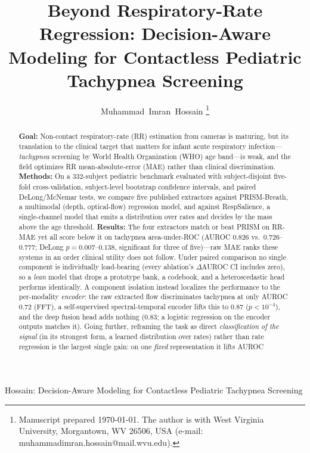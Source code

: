 \documentclass[journal]{IEEEtran}
\begin{document}
\title{Beyond Respiratory-Rate Regression: Decision-Aware Modeling for Contactless Pediatric Tachypnea
Screening}

\author{Muhammad~Imran~Hossain%
\thanks{Manuscript prepared \today. The author is with West Virginia University, Morgantown, WV 26506,
USA (e-mail: muhammadimran.hossain@mail.wvu.edu).}}

%
{Hossain: Decision-Aware Modeling for Contactless Pediatric Tachypnea Screening}

\maketitle

\begin{abstract}
\textbf{Goal:} Non-contact respiratory-rate (RR) estimation from cameras is maturing, but its
translation to the clinical target that matters for infant acute respiratory infection---\emph{tachypnea}
screening by World Health Organization (WHO) age band---is weak, and the field optimizes RR
mean-absolute-error (MAE) rather than clinical discrimination. \textbf{Methods:} On a 332-subject
pediatric benchmark evaluated with subject-disjoint five-fold cross-validation, subject-level bootstrap
confidence intervals, and paired DeLong/McNemar tests, we compare five published extractors against
PRISM-Breath, a multimodal (depth, optical-flow) regression model, and against RespSalience, a
single-channel model that emits a distribution over rates and decides by the mass above the age
threshold. \textbf{Results:} The four extractors match or beat PRISM on RR-MAE yet all score below it on
tachypnea area-under-ROC
(AUROC $0.826$ vs.\ $0.726$--$0.777$; DeLong $p=0.007$--$0.138$, significant for three of five)---raw MAE ranks these systems in an order clinical utility does not follow. Under paired
comparison no single component is individually load-bearing (every ablation's $\Delta$AUROC CI includes
zero), so a \emph{lean} model that drops a prototype bank, a codebook, and a heteroscedastic head performs
identically. A component isolation instead localizes the performance to the per-modality \emph{encoder}: the raw
extracted flow discriminates tachypnea at only AUROC $0.72$ (FFT), a self-supervised spectral-temporal
encoder lifts this to $0.87$ ($p<10^{-4}$), and the deep fusion head adds nothing ($0.83$; a logistic
regression on the encoder outputs matches it). Going further, reframing the task as direct \emph{classification of the
signal} (in its strongest form, a learned distribution over rates) rather than rate regression is the largest single gain: on one \emph{fixed} representation it lifts AUROC

\end{abstract}
\end{document}
